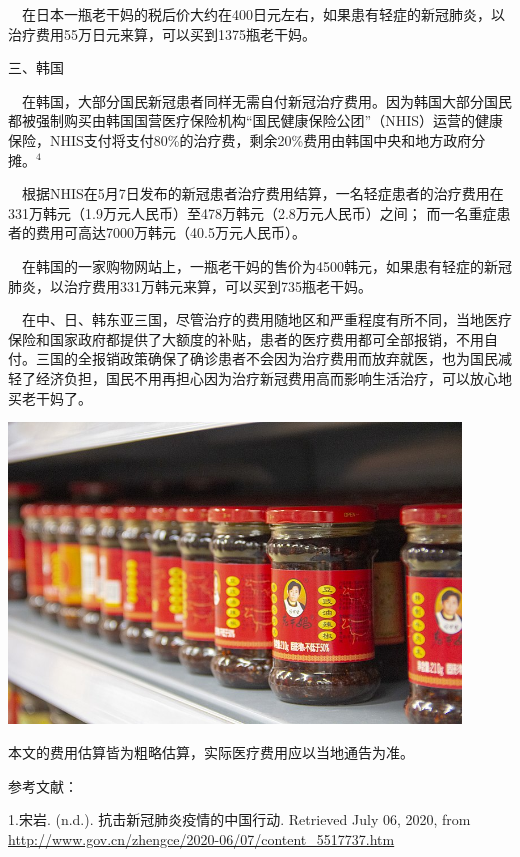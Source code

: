 \documentclass[]{article}
\begin{document}
\(\quad\)在日本一瓶老干妈的税后价大约在400日元左右，如果患有轻症的新冠肺炎，以治疗费用55万日元来算，可以买到1375瓶老干妈。

三、韩国

\(\quad\)在韩国，大部分国民新冠患者同样无需自付新冠治疗费用。因为韩国大部分国民都被强制购买由韩国国营医疗保险机构``国民健康保险公团''（NHIS）运营的健康保险，NHIS支付将支付80\%的治疗费，剩余20\%费用由韩国中央和地方政府分摊。\(^4\)

\(\quad\)根据NHIS在5月7日发布的新冠患者治疗费用结算，一名轻症患者的治疗费用在331万韩元（1.9万元人民币）至478万韩元（2.8万元人民币）之间；
而一名重症患者的费用可高达7000万韩元（40.5万元人民币）。

\(\quad\)在韩国的一家购物网站上，一瓶老干妈的售价为4500韩元，如果患有轻症的新冠肺炎，以治疗费用331万韩元来算，可以买到735瓶老干妈。

\(\quad\)在中、日、韩东亚三国，尽管治疗的费用随地区和严重程度有所不同，当地医疗保险和国家政府都提供了大额度的补贴，患者的医疗费用都可全部报销，不用自付。三国的全报销政策确保了确诊患者不会因为治疗费用而放弃就医，也为国民减轻了经济负担，国民不用再担心因为治疗新冠费用高而影响生活治疗，可以放心地买老干妈了。

\vspace{2mm}

\begin{center}
\includegraphics[height=8cm]{./input/module3.jpg}
\end{center}

\vspace{5mm}

\Large *本文的费用估算皆为粗略估算，实际医疗费用应以当地通告为准。

参考文献：

1.宋岩. (n.d.). 抗击新冠肺炎疫情的中国行动. Retrieved July 06, 2020,
from \url{http://www.gov.cn/zhengce/2020-06/07/content_5517737.htm}
\end{document}
